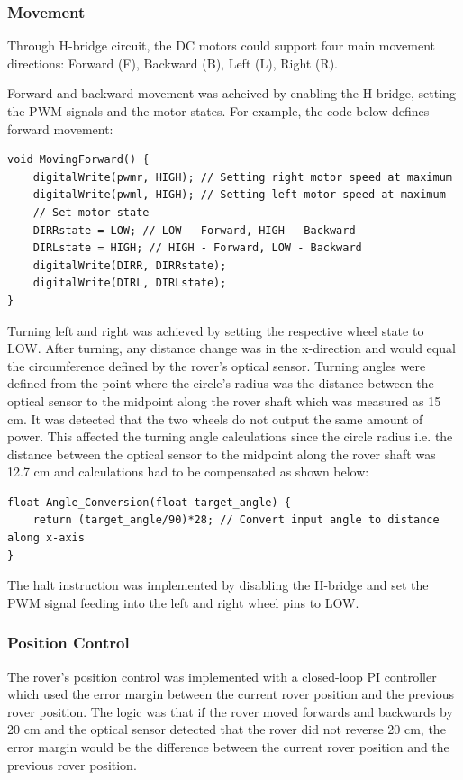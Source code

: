 \documentclass[11pt, a4paper]{article}
\begin{document}
\subsubsection{Movement}

Through H-bridge circuit, the DC motors could support four main movement directions: Forward (F), Backward (B), Left (L), Right (R). 

Forward and backward movement was acheived by enabling the H-bridge, setting the PWM signals and the motor states. For example, the code below defines forward movement: 

\begin{lstlisting}
void MovingForward() {
    digitalWrite(pwmr, HIGH); // Setting right motor speed at maximum 
    digitalWrite(pwml, HIGH); // Setting left motor speed at maximum 
    // Set motor state 
    DIRRstate = LOW; // LOW - Forward, HIGH - Backward
    DIRLstate = HIGH; // HIGH - Forward, LOW - Backward
    digitalWrite(DIRR, DIRRstate); 
    digitalWrite(DIRL, DIRLstate); 
} 
\end{lstlisting}

Turning left and right was achieved by setting the respective wheel state to LOW. After turning, any distance change was in the x-direction and would equal the circumference defined by the rover's optical sensor. Turning angles were defined from the point where the circle's radius was the distance between the optical sensor to the midpoint along the rover shaft which was measured as 15 cm. It was detected that the two wheels do not output the same amount of power. This affected the turning angle calculations since the circle radius i.e. the distance between the optical sensor to the midpoint along the rover shaft was 12.7 cm and calculations had to be compensated as shown below:

\begin{lstlisting}
float Angle_Conversion(float target_angle) {
    return (target_angle/90)*28; // Convert input angle to distance along x-axis
} 
\end{lstlisting}

The halt instruction was implemented by disabling the H-bridge and set the PWM signal feeding into the left and right wheel pins to LOW.

\subsubsection{Position Control}

The rover's position control was implemented with a closed-loop PI controller which used the error margin between the current rover position and the previous rover position. The logic was that if the rover moved forwards and backwards by 20 cm and the optical sensor detected that the rover did not reverse 20 cm, the error margin would be the difference between the current rover position and the previous rover position.  
\end{document}
